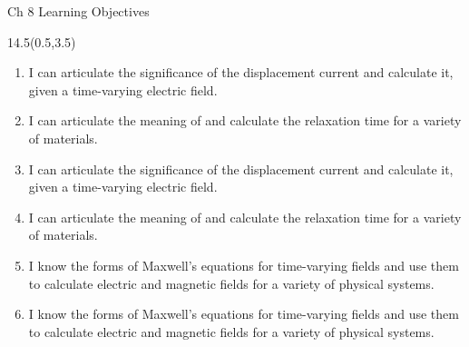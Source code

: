 \def\obja{I can articulate the significance of the displacement current and calculate it, given a time-varying electric field.}
\def\objb{I can articulate the meaning of and calculate the relaxation time for a variety of materials.}
\def\objc{ I know the forms of Maxwell's equations for time-varying fields and use them to calculate electric and magnetic fields for a variety of physical systems. }
\begin{frame}{Ch 8 Learning Objectives}
	\begin{textblock}{14.5}(0.5,3.5)
	\begin{myblock}[0.95]{}
	\begin{small}
	\begin{enumerate}[{8}.1]
		\ifnum{}
			\item \alert{ \obja }
			\item \alert{ \objb }
		\else 
			\item \obja
			\item \objb
		\fi 
		\ifnum{}
			\item \alert{ \objc }
		\else 
			\item \objc
		\fi 
	\end{enumerate}
	\end{small}
	\end{myblock}
	\end{textblock}
\end{frame}
